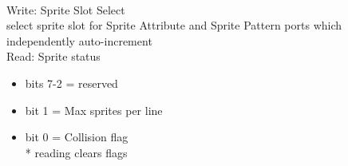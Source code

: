 \\
Write: Sprite Slot Select\\
select sprite slot for Sprite Attribute and Sprite Pattern ports which
independently auto-increment\\
Read: Sprite status
\begin{itemize}
\item[] bits 7-2 = reserved
\item[] bit 1 = Max sprites per line
\item[] bit 0 = Collision flag\\
* reading clears flags
\end{itemize}

